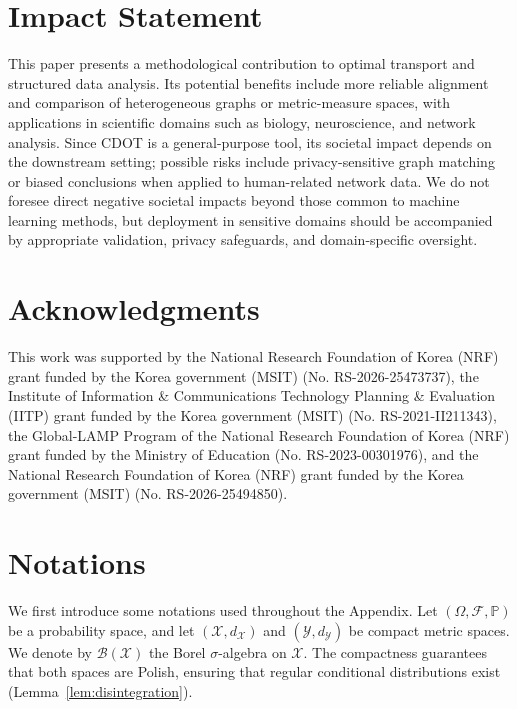 \documentclass{article}
\theoremstyle{plain}
\theoremstyle{definition}
\theoremstyle{remark}
\begin{document}
\section*{Impact Statement}\label{sec:Impact}
This paper presents a methodological contribution to optimal transport and structured data analysis. Its potential benefits include more reliable alignment and comparison of heterogeneous graphs or metric-measure spaces, with applications in scientific domains such as biology, neuroscience, and network analysis. Since CDOT is a general-purpose tool, its societal impact depends on the downstream setting; possible risks include privacy-sensitive graph matching or biased conclusions when applied to human-related network data. We do not foresee direct negative societal impacts beyond those common to machine learning methods, but deployment in sensitive domains should be accompanied by appropriate validation, privacy safeguards, and domain-specific oversight.

\section*{Acknowledgments}\label{sec:Acknowledgments}
This work was supported by the National Research Foundation of Korea (NRF) grant funded by the Korea government (MSIT) (No. RS-2026-25473737), the Institute of Information \& Communications Technology Planning \& Evaluation (IITP) grant funded by the Korea government (MSIT) (No. RS-2021-II211343), the Global-LAMP Program of the National Research Foundation of Korea (NRF) grant funded by the Ministry of Education (No. RS-2023-00301976), and the National Research Foundation of Korea (NRF) grant funded by the Korea government (MSIT) (No. RS-2026-25494850).




\newpage
\appendix
\onecolumn

\section{Notations}
We first introduce some notations used throughout the Appendix.
Let $(\Omega,\mathcal{F},\mathbb{P})$ be a probability space, and let $(\mathcal{X},d_{\mathcal{X}})$ and $(\mathcal{Y},d_{\mathcal{Y}})$ be compact metric spaces. We denote by $\mathcal{B}(\mathcal{X})$ the Borel $\sigma$-algebra on $\mathcal{X}$. The compactness guarantees that both spaces are Polish, ensuring that regular conditional distributions exist (Lemma~\ref{lem:disintegration}).
\end{document}
